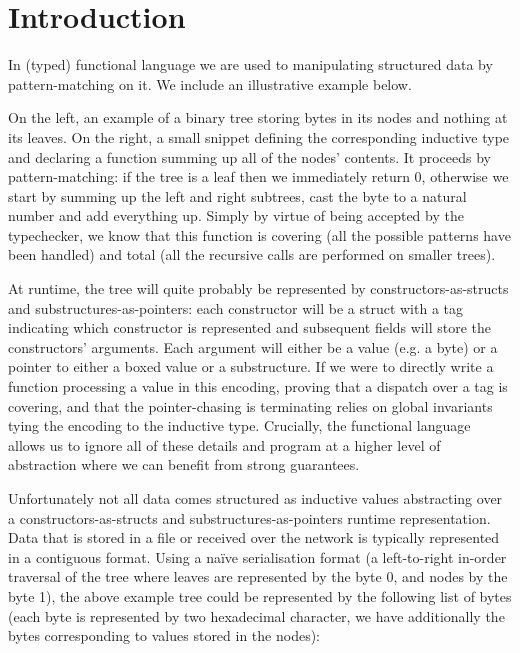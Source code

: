 \section{Introduction}

In (typed) functional language we are used to manipulating
structured data by pattern-matching on it.
We include an illustrative example below.

\begin{minipage}{.5\textwidth}

\end{minipage}\hfill
\begin{minipage}{.45\textwidth}
\end{minipage}

On the left, an example of a binary tree storing bytes in its nodes and
nothing at its leaves.
%
On the right, a small \idris{} snippet defining the corresponding
inductive type and declaring a function summing up all of the
nodes' contents.
%
It proceeds by pattern-matching:
%
if the tree is a leaf then we immediately return 0,
otherwise we start by summing up the left and right subtrees, cast the
byte to a natural number and add everything up.
%
Simply by virtue of being accepted by the typechecker, we know that
this function is covering (all the possible patterns have been handled)
and total (all the recursive calls are performed on smaller trees).

At runtime, the tree will quite probably be represented by
constructors-as-structs and substructures-as-pointers:
%
each constructor will be a struct with a tag indicating which
constructor is represented and subsequent fields will store
the constructors' arguments.
%
Each argument will either be a value (e.g. a byte) or a pointer
to either a boxed value or a substructure.
%
If we were to directly write a function processing a value in this
encoding, proving that a dispatch over a tag is covering, and that
the pointer-chasing is terminating relies on global invariants
tying the encoding to the inductive type.
%
Crucially, the functional language allows us to ignore all of these
details and program at a higher level of abstraction where we can
benefit from strong guarantees.

Unfortunately not all data comes structured as inductive values
abstracting over a constructors-as-structs and substructures-as-pointers
runtime representation.
%
Data that is stored in a file or received over the network is typically
represented in a contiguous format.
%
Using a naïve serialisation format (a left-to-right in-order traversal
of the tree where leaves are represented by the byte 0, and nodes by
the byte 1), the above example tree could be represented by the
following list of bytes
(each byte is represented by two hexadecimal character,
we have additionally  the bytes
corresponding to values stored in the nodes):


